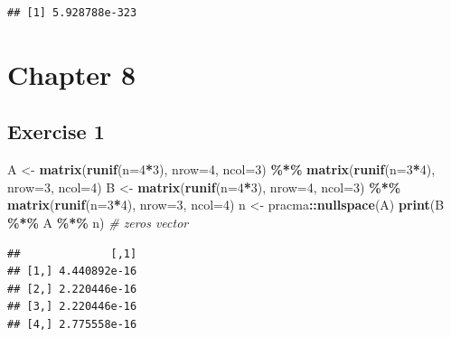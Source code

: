 \documentclass[
]{book}
\newenvironment{Shaded}{\begin{snugshade}}{\end{snugshade}}
\newcommand{\CommentTok}[1]{\textcolor[rgb]{0.56,0.35,0.01}{\textit{#1}}}
\newcommand{\DataTypeTok}[1]{\textcolor[rgb]{0.13,0.29,0.53}{#1}}
\newcommand{\DecValTok}[1]{\textcolor[rgb]{0.00,0.00,0.81}{#1}}
\newcommand{\KeywordTok}[1]{\textcolor[rgb]{0.13,0.29,0.53}{\textbf{#1}}}
\newcommand{\NormalTok}[1]{#1}
\newcommand{\OperatorTok}[1]{\textcolor[rgb]{0.81,0.36,0.00}{\textbf{#1}}}
\newcommand{\StringTok}[1]{\textcolor[rgb]{0.31,0.60,0.02}{#1}}
\begin{document}
\begin{verbatim}
## [1] 5.928788e-323
\end{verbatim}

\hypertarget{chapter-8-1}{%
\section*{Chapter 8}\label{chapter-8-1}}

\hypertarget{exercise-1-4}{%
\subsection*{Exercise 1}\label{exercise-1-4}}

\begin{Shaded}
\begin{Highlighting}[]
\NormalTok{A \textless{}{-}}\StringTok{ }\KeywordTok{matrix}\NormalTok{(}\KeywordTok{runif}\NormalTok{(}\DataTypeTok{n=}\DecValTok{4}\OperatorTok{*}\DecValTok{3}\NormalTok{), }\DataTypeTok{nrow=}\DecValTok{4}\NormalTok{, }\DataTypeTok{ncol=}\DecValTok{3}\NormalTok{) }\OperatorTok{\%*\%}\StringTok{ }\KeywordTok{matrix}\NormalTok{(}\KeywordTok{runif}\NormalTok{(}\DataTypeTok{n=}\DecValTok{3}\OperatorTok{*}\DecValTok{4}\NormalTok{), }\DataTypeTok{nrow=}\DecValTok{3}\NormalTok{, }\DataTypeTok{ncol=}\DecValTok{4}\NormalTok{)}
\NormalTok{B \textless{}{-}}\StringTok{ }\KeywordTok{matrix}\NormalTok{(}\KeywordTok{runif}\NormalTok{(}\DataTypeTok{n=}\DecValTok{4}\OperatorTok{*}\DecValTok{3}\NormalTok{), }\DataTypeTok{nrow=}\DecValTok{4}\NormalTok{, }\DataTypeTok{ncol=}\DecValTok{3}\NormalTok{) }\OperatorTok{\%*\%}\StringTok{ }\KeywordTok{matrix}\NormalTok{(}\KeywordTok{runif}\NormalTok{(}\DataTypeTok{n=}\DecValTok{3}\OperatorTok{*}\DecValTok{4}\NormalTok{), }\DataTypeTok{nrow=}\DecValTok{3}\NormalTok{, }\DataTypeTok{ncol=}\DecValTok{4}\NormalTok{)}
\NormalTok{n \textless{}{-}}\StringTok{ }\NormalTok{pracma}\OperatorTok{::}\KeywordTok{nullspace}\NormalTok{(A)}
\KeywordTok{print}\NormalTok{(B }\OperatorTok{\%*\%}\StringTok{ }\NormalTok{A }\OperatorTok{\%*\%}\StringTok{ }\NormalTok{n) }\CommentTok{\# zeros vector}
\end{Highlighting}
\end{Shaded}

\begin{verbatim}
##              [,1]
## [1,] 4.440892e-16
## [2,] 2.220446e-16
## [3,] 2.220446e-16
## [4,] 2.775558e-16
\end{verbatim}
\end{document}
